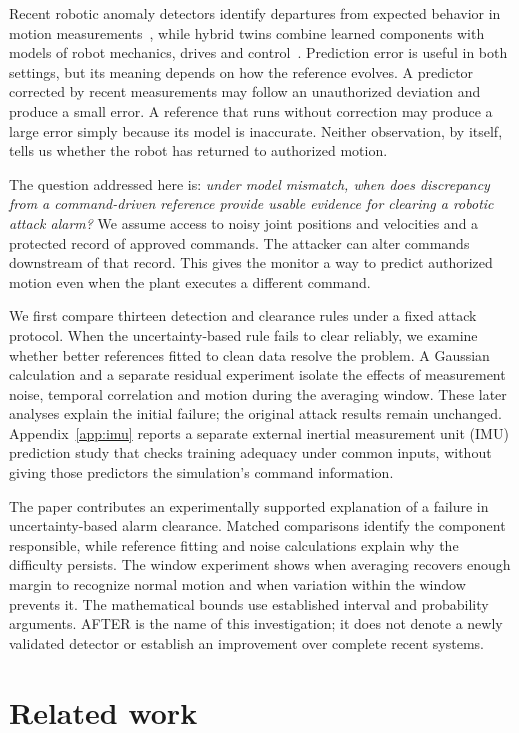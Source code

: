 \documentclass[11pt]{article}
\begin{document}
Recent robotic anomaly detectors identify departures from expected behavior in motion measurements~\cite{casper,edge}, while hybrid twins combine learned components with models of robot mechanics, drives and control~\cite{hybrid}. Prediction error is useful in both settings, but its meaning depends on how the reference evolves. A predictor corrected by recent measurements may follow an unauthorized deviation and produce a small error. A reference that runs without correction may produce a large error simply because its model is inaccurate. Neither observation, by itself, tells us whether the robot has returned to authorized motion.

The question addressed here is: \emph{under model mismatch, when does discrepancy from a command-driven reference provide usable evidence for clearing a robotic attack alarm?} We assume access to noisy joint positions and velocities and a protected record of approved commands. The attacker can alter commands downstream of that record. This gives the monitor a way to predict authorized motion even when the plant executes a different command.

We first compare thirteen detection and clearance rules under a fixed attack protocol. When the uncertainty-based rule fails to clear reliably, we examine whether better references fitted to clean data resolve the problem. A Gaussian calculation and a separate residual experiment isolate the effects of measurement noise, temporal correlation and motion during the averaging window. These later analyses explain the initial failure; the original attack results remain unchanged. Appendix~\ref{app:imu} reports a separate external inertial measurement unit (IMU) prediction study that checks training adequacy under common inputs, without giving those predictors the simulation's command information.

The paper contributes an experimentally supported explanation of a failure in uncertainty-based alarm clearance. Matched comparisons identify the component responsible, while reference fitting and noise calculations explain why the difficulty persists. The window experiment shows when averaging recovers enough margin to recognize normal motion and when variation within the window prevents it. The mathematical bounds use established interval and probability arguments. AFTER is the name of this investigation; it does not denote a newly validated detector or establish an improvement over complete recent systems.

\section{Related work}
\end{document}
